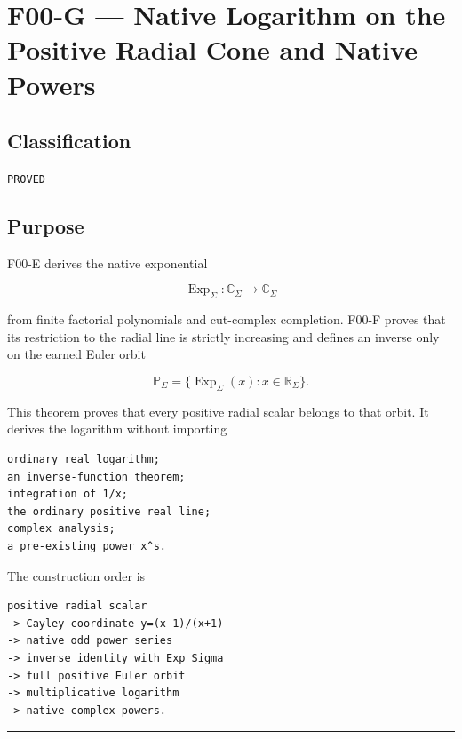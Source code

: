 \hypertarget{f00-g-native-logarithm-on-the-positive-radial-cone-and-native-powers}{%
\chapter{F00-G --- Native Logarithm on the Positive Radial Cone and Native Powers}\label{f00-g-native-logarithm-on-the-positive-radial-cone-and-native-powers}}

\hypertarget{classification}{%
\section{Classification}\label{classification}}

\texttt{PROVED}

\hypertarget{purpose}{%
\section{Purpose}\label{purpose}}

F00-E derives the native exponential

\[
\operatorname{Exp}_\Sigma:\mathbb C_\Sigma\to\mathbb C_\Sigma
\]

from finite factorial polynomials and cut-complex completion. F00-F proves that
its restriction to the radial line is strictly increasing and defines an inverse
only on the earned Euler orbit

\[
\mathbb P_\Sigma
=
\{\operatorname{Exp}_\Sigma(x):x\in\mathbb R_\Sigma\}.
\]

This theorem proves that every positive radial scalar belongs to that orbit. It
derives the logarithm without importing

\begin{verbatim}
ordinary real logarithm;
an inverse-function theorem;
integration of 1/x;
the ordinary positive real line;
complex analysis;
a pre-existing power x^s.
\end{verbatim}

The construction order is

\begin{verbatim}
positive radial scalar
-> Cayley coordinate y=(x-1)/(x+1)
-> native odd power series
-> inverse identity with Exp_Sigma
-> full positive Euler orbit
-> multiplicative logarithm
-> native complex powers.
\end{verbatim}

\begin{center}\rule{0.5\linewidth}{0.5pt}\end{center}

